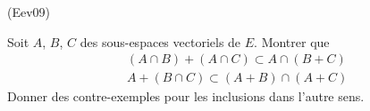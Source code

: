 \begin{tiny}(Eev09)\end{tiny}
Soit $A$, $B$, $C$ des sous-espaces vectoriels de $E$. Montrer que
\begin{align*}
&(A\cap B)+(A\cap C)\subset A\cap (B+C)\\
&A + (B\cap C) \subset (A+B) \cap (A+C) 
\end{align*}
Donner des contre-exemples pour les inclusions dans l'autre sens.